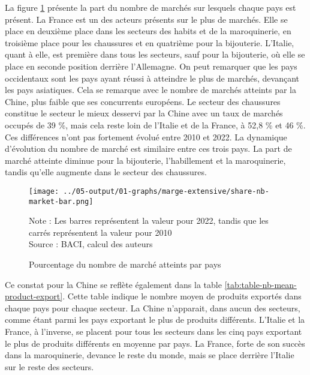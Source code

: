 \documentclass[french,10pt,a4paper]{article}
\begin{document}
La figure \ref{fig:nb-market-bar} présente la part du nombre de marchés sur lesquels chaque pays est présent. La France est un des acteurs présents sur le plus de marchés. Elle se place en deuxième place dans les secteurs des habits et de la maroquinerie, en troisième place pour les chaussures et en quatrième pour la bijouterie. L'Italie, quant à elle, est première dans tous les secteurs, sauf pour la bijouterie, où elle se place en seconde position derrière l'Allemagne. On peut remarquer que les pays occidentaux sont les pays ayant réussi à atteindre le plus de marchés, devançant les pays asiatiques. Cela se remarque avec le nombre de marchés atteints par la Chine, plus faible que ses concurrents européens. Le secteur des chaussures constitue le secteur le mieux desservi par la Chine avec un taux de marchés occupés de 39 \%, mais cela reste loin de l'Italie et de la France, à 52,8 \% et 46 \%. Ces différences n'ont pas fortement évolué entre 2010 et 2022. La dynamique d'évolution du nombre de marché est similaire entre ces trois pays. La part de marché atteinte diminue pour la bijouterie, l'habillement et la maroquinerie, tandis qu'elle augmente dans le secteur des chaussures.

\begin{figure}[!h]
  \centering
  \texttt{[image: ../05-output/01-graphs/marge-extensive/share-nb-market-bar.png]}
  \captionsetup{justification=justified, singlelinecheck=false, font=small}
  \caption*{Note : Les barres représentent la valeur pour 2022, tandis que les carrés représentent la valeur pour 2010 \\
  Source : BACI, calcul des auteurs}
  \captionsetup{justification=centering, singlelinecheck=true, font=normalsize}
  \caption{Pourcentage du nombre de marché atteints par pays}
  \label{fig:nb-market-bar}
\end{figure}

Ce constat pour la Chine se reflète également dans la table \ref{tab:table-nb-mean-product-export}. Cette table indique le nombre moyen de produits exportés dans chaque pays pour chaque secteur. La Chine n'apparait, dans aucun des secteurs, comme étant parmi les pays exportant le plus de produits différents. L'Italie et la France, à l'inverse, se placent pour tous les secteurs dans les cinq pays exportant le plus de produits différents en moyenne par pays. La France, forte de son succès dans la maroquinerie, devance le reste du monde, mais se place derrière l'Italie sur le reste des secteurs.
\end{document}
